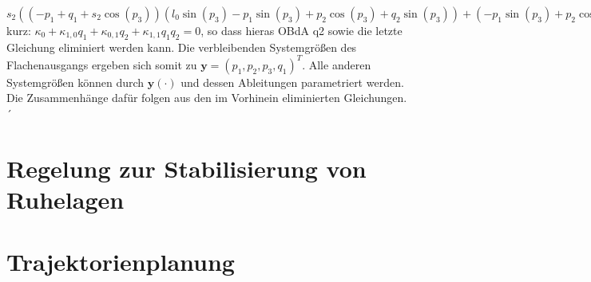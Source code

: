 $s_{2} \left(\left(- p_{1} + q_{1} + s_{2} \cos{\left(p_{3} \right)}\right) \left(l_{0} \sin{\left(p_{3} \right)} - p_{1} \sin{\left(p_{3} \right)} + p_{2} \cos{\left(p_{3} \right)} + q_{2} \sin{\left(p_{3} \right)}\right) + \left(- p_{1} \sin{\left(p_{3} \right)} + p_{2} \cos{\left(p_{3} \right)} + q_{1} \sin{\left(p_{3} \right)}\right) \left(l_{0} - p_{1} + q_{2} - s_{2} \cos{\left(p_{3} \right)}\right)\right) \left(l_{1} l_{2} m_{2} \left(g + \ddot{p}_{2}\right) - l_{1} \tau_{4} \left(p_{2} + s_{2} \sin{\left(p_{3} \right)}\right) - l_{2} \tau_{3} \left(p_{2} - s_{2} \sin{\left(p_{3} \right)}\right)\right) + s_{2} \left(l_{1} l_{2} m_{2} \ddot{p}_{1} + l_{1} \tau_{4} \left(l_{0} - p_{1} + q_{2} - s_{2} \cos{\left(p_{3} \right)}\right) + l_{2} \tau_{3} \left(- p_{1} + q_{1} + s_{2} \cos{\left(p_{3} \right)}\right)\right) \left(l_{0} p_{2} \sin{\left(p_{3} \right)} - l_{0} s_{2} \sin^{2}{\left(p_{3} \right)} - 2 p_{1} p_{2} \sin{\left(p_{3} \right)} + 2 p_{2}^{2} \cos{\left(p_{3} \right)} + p_{2} q_{1} \sin{\left(p_{3} \right)} + p_{2} q_{2} \sin{\left(p_{3} \right)} + q_{1} s_{2} \sin^{2}{\left(p_{3} \right)} - q_{2} s_{2} \sin^{2}{\left(p_{3} \right)}\right) + \left(\left(p_{2} - s_{2} \sin{\left(p_{3} \right)}\right) \left(l_{0} - p_{1} + q_{2} - s_{2} \cos{\left(p_{3} \right)}\right) - \left(p_{2} + s_{2} \sin{\left(p_{3} \right)}\right) \left(- p_{1} + q_{1} + s_{2} \cos{\left(p_{3} \right)}\right)\right) \left(J_{2} l_{1} l_{2} \ddot{p}_{3} + l_{1} s_{2} \tau_{4} \left(- l_{0} \sin{\left(p_{3} \right)} + p_{1} \sin{\left(p_{3} \right)} - p_{2} \cos{\left(p_{3} \right)} - q_{2} \sin{\left(p_{3} \right)}\right) + l_{2} s_{2} \tau_{3} \left(- p_{1} \sin{\left(p_{3} \right)} + p_{2} \cos{\left(p_{3} \right)} + q_{1} \sin{\left(p_{3} \right)}\right)\right) = 0$
kurz:
$\kappa_0 + \kappa_{1, 0} q_1+ \kappa_{0,1} q_2 + \kappa_{1, 1} q_1 q_2 = 0$, so dass hieras OBdA q2 sowie die letzte Gleichung eliminiert werden kann. Die verbleibenden Systemgrößen des Flachenausgangs ergeben sich somit zu $\mathbf{y} = (p_1, p_2, p_3, q_1)^T$. Alle anderen Systemgrößen können durch $\mathbf y(\cdot)$ und dessen Ableitungen parametriert werden. Die Zusammenhänge dafür folgen aus den im Vorhinein eliminierten Gleichungen.´ 

\section{Regelung zur Stabilisierung von Ruhelagen}

\section{Trajektorienplanung}

